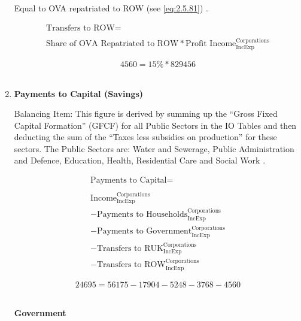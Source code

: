 \begin{enumerate}
Equal to OVA repatriated to ROW (see \ref{eq:2.5.81}) \cite{ScotGov2012}.

\begin{equation}
\begin{split}
\text{Transfers to ROW} =  \\ \\
\text{Share of OVA Repatriated to ROW}*\text{Profit Income}^\text{Corporations}_\text{IncExp}
\end{split} \label{eq:2.5.32}
\end{equation}

\begin{equation} \nonumber
4560 = 15\%*829456
\end{equation}\\


\item \textbf {Payments to Capital (Savings)}

Balancing Item: This figure is derived by summing up the ``Gross Fixed Capital Formation'' (GFCF) for all Public Sectors in the IO Tables and then deducting the sum of the ``Taxes less subsidies on production'' for these sectors. The Public Sectors are: Water and Sewerage, Public Administration and Defence, Education, Health, Residential Care and Social Work \cite{ScotGov2013a}.

\begin{equation}
\begin{split}
\text{Payments to Capital} =  \\ \\
\text{Income}^\text{Corporations}_\text{IncExp}\\
-\text{Payments to Households}^\text{Corporations}_\text{IncExp}\\
-\text{Payments to Government}^\text{Corporations}_\text{IncExp}\\
-\text{Transfers to RUK}^\text{Corporations}_\text{IncExp}\\
-\text{Transfers to ROW}^\text{Corporations}_\text{IncExp}
\end{split} \label{eq:2.5.33}
\end{equation}

\begin{equation} \nonumber
24695 = 56175-17904-5248-3768-4560
\end{equation}\\


\pagebreak

\begin{center}
\textbf{\LARGE Government}
\end{center}


\end{enumerate}
